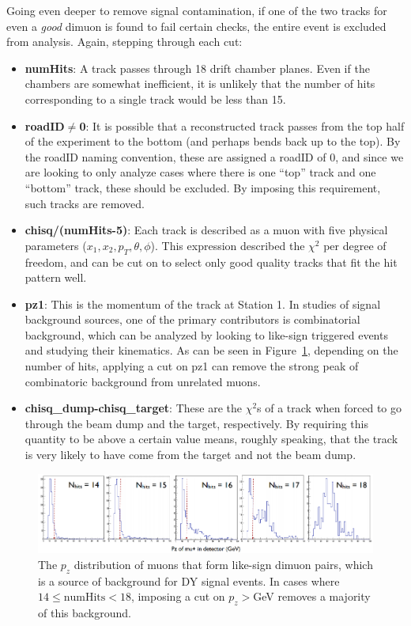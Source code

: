 Going even deeper to remove signal contamination, if one of the two tracks for even a \emph{good} dimuon is found to fail certain checks, the entire event is excluded from analysis. Again, stepping through each cut:
\begin{itemize}
	\item \textbf{numHits}: A track passes through 18 drift chamber planes. Even if the chambers are somewhat inefficient, it is unlikely that the number of hits corresponding to a single track would be less than 15.
	\item \textbf{roadID$\neq$0}: It is possible that a reconstructed track passes from the top half of the experiment to the bottom (and perhaps bends back up to the top). By the roadID naming convention, these are assigned a roadID of 0, and since we are looking to only analyze cases where there is one ``top'' track and one ``bottom'' track, these should be excluded. By imposing this requirement, such tracks are removed.
	\item \textbf{chisq/(numHits-5)}: Each track is described as a muon with five physical parameters ($x_1, x_2, p_T, \theta, \phi$). This expression described the $\chi^2$ per degree of freedom, and can be cut on to select only good quality tracks that fit the hit pattern well.
	\item \textbf{pz1}: This is the momentum of the track at Station 1. In studies of signal background sources, one of the primary contributors is combinatorial background, which can be analyzed by looking to like-sign triggered events and studying their kinematics. As can be seen in Figure~\ref{fig:likesign-pz-cut}, depending on the number of hits, applying a cut on pz1 can remove the strong peak of combinatoric background from unrelated muons.
	\item \textbf{chisq\_dump-chisq\_target}: These are the $\chi^2$s of a track when forced to go through the beam dump and the target, respectively. By requiring this quantity to be above a certain value means, roughly speaking, that the track is very likely to have come from the target and not the beam dump. 
\end{itemize}

\begin{figure}
	\centering
	\includegraphics[width=\textwidth]{figures/analysis/likesign-pz-cut.png}
	\caption{The $p_z$ distribution of muons that form like-sign dimuon pairs, which is a source of background for DY signal events. In cases where $14\leq\text{numHits}<18$, imposing a cut on $p_z>$\unit[18]{GeV} removes a majority of this background.}
	\label{fig:likesign-pz-cut}
\end{figure}

